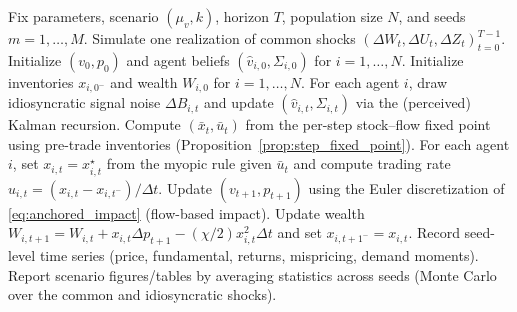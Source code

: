 \begin{algorithm}[t]
\caption{Particle approximation (one scenario)}
\label{alg:particle}
\begin{algorithmic}[1]
\STATE Fix parameters, scenario $(\mu_v,k)$, horizon $T$, population size $N$, and seeds $m=1,\dots,M$.
  \STATE Simulate one realization of common shocks $(\Delta W_t,\Delta U_t,\Delta Z_t)_{t=0}^{T-1}$.
  \STATE Initialize $(v_0,p_0)$ and agent beliefs $(\hat v_{i,0},\Sigma_{i,0})$ for $i=1,\dots,N$.
  \STATE Initialize inventories $x_{i,0^-}$ and wealth $W_{i,0}$ for $i=1,\dots,N$.
    \STATE For each agent $i$, draw idiosyncratic signal noise $\Delta B_{i,t}$ and update $(\hat v_{i,t},\Sigma_{i,t})$ via the (perceived) Kalman recursion.
    \STATE Compute $(\bar x_t,\bar u_t)$ from the per-step stock--flow fixed point using pre-trade inventories (Proposition~\ref{prop:step_fixed_point}).
    \STATE For each agent $i$, set $x_{i,t}=x^\star_{i,t}$ from the myopic rule given $\bar u_t$ and compute trading rate $u_{i,t}=(x_{i,t}-x_{i,t^-})/\Delta t$.
    \STATE Update $(v_{t+1},p_{t+1})$ using the Euler discretization of \eqref{eq:anchored_impact} (flow-based impact).
    \STATE Update wealth $W_{i,t+1}=W_{i,t}+x_{i,t}\Delta p_{t+1}-(\chi/2)x_{i,t}^2\Delta t$ and set $x_{i,t+1^-}=x_{i,t}$.
  \ENDFOR
  \STATE Record seed-level time series (price, fundamental, returns, mispricing, demand moments).
\ENDFOR
\STATE Report scenario figures/tables by averaging statistics across seeds (Monte Carlo over the common and idiosyncratic shocks).
\end{algorithmic}
\end{algorithm}



\begin{table}[t]
  \centering
  \scriptsize
  \setlength{\tabcolsep}{3pt}
  \resizebox{\columnwidth}{!}{}
  \caption{Belief and market moments by scenario (mean $\pm$ 95\% CI across random seeds).}
  \label{tab:metrics}
\end{table}

\begin{table}[t]
  \centering
  \scriptsize
  \setlength{\tabcolsep}{3pt}
  \resizebox{\columnwidth}{!}{}
  \caption{Mispricing tails and persistence diagnostics by scenario (mean $\pm$ 95\% CI across random seeds).}
  \label{tab:mispricing_persistence}
\end{table}

